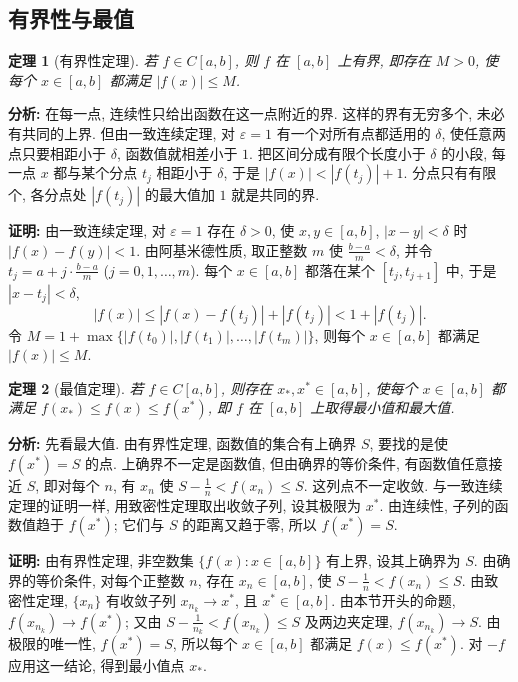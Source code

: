 \documentclass[UTF8,openany]{ctexbook}
\theoremstyle{chinesetextbook}
\newtheorem{theorem}{定理}[section]
\newenvironment{cnproof}{\par\indent\textbf{证明:} \ignorespaces}{\par}
\begin{document}
\subsection{有界性与最值}
\begin{theorem}[有界性定理]
若 $f\in C[a,b]$, 则 $f$ 在 $[a,b]$ 上有界, 即存在 $M>0$, 使每个 $x\in[a,b]$ 都满足 $|f(x)|\le M$.
\end{theorem}
\par\indent\textbf{分析:} 在每一点, 连续性只给出函数在这一点附近的界. 这样的界有无穷多个, 未必有共同的上界. 但由一致连续定理, 对 $\varepsilon=1$ 有一个对所有点都适用的 $\delta$, 使任意两点只要相距小于 $\delta$, 函数值就相差小于 $1$. 把区间分成有限个长度小于 $\delta$ 的小段, 每一点 $x$ 都与某个分点 $t_j$ 相距小于 $\delta$, 于是 $|f(x)|<|f(t_j)|+1$. 分点只有有限个, 各分点处 $|f(t_j)|$ 的最大值加 $1$ 就是共同的界.
\begin{cnproof}
由一致连续定理, 对 $\varepsilon=1$ 存在 $\delta>0$, 使 $x,y\in[a,b]$, $|x-y|<\delta$ 时 $|f(x)-f(y)|<1$. 由阿基米德性质, 取正整数 $m$ 使 $\displaystyle\frac{b-a}m<\delta$, 并令 $\displaystyle t_j=a+j\cdot\frac{b-a}m$ ($j=0,1,\ldots,m$). 每个 $x\in[a,b]$ 都落在某个 $[t_j,t_{j+1}]$ 中, 于是 $|x-t_j|<\delta$,
\[
|f(x)|\le|f(x)-f(t_j)|+|f(t_j)|<1+|f(t_j)|.
\]
令 $M=1+\max\{|f(t_0)|,|f(t_1)|,\ldots,|f(t_m)|\}$, 则每个 $x\in[a,b]$ 都满足 $|f(x)|\le M$.
\end{cnproof}
\begin{theorem}[最值定理]
若 $f\in C[a,b]$, 则存在 $x_*,x^*\in[a,b]$, 使每个 $x\in[a,b]$ 都满足 $f(x_*)\le f(x)\le f(x^*)$, 即 $f$ 在 $[a,b]$ 上取得最小值和最大值.
\end{theorem}
\par\indent\textbf{分析:} 先看最大值. 由有界性定理, 函数值的集合有上确界 $S$, 要找的是使 $f(x^*)=S$ 的点. 上确界不一定是函数值, 但由确界的等价条件, 有函数值任意接近 $S$, 即对每个 $n$, 有 $x_n$ 使 $\displaystyle S-\frac1n<f(x_n)\le S$. 这列点不一定收敛. 与一致连续定理的证明一样, 用致密性定理取出收敛子列, 设其极限为 $x^*$. 由连续性, 子列的函数值趋于 $f(x^*)$; 它们与 $S$ 的距离又趋于零, 所以 $f(x^*)=S$.
\begin{cnproof}
由有界性定理, 非空数集 $\{f(x):x\in[a,b]\}$ 有上界, 设其上确界为 $S$. 由确界的等价条件, 对每个正整数 $n$, 存在 $x_n\in[a,b]$, 使 $\displaystyle S-\frac1n<f(x_n)\le S$. 由致密性定理, $\{x_n\}$ 有收敛子列 $x_{n_k}\to x^*$, 且 $x^*\in[a,b]$. 由本节开头的命题, $f(x_{n_k})\to f(x^*)$; 又由 $\displaystyle S-\frac1{n_k}<f(x_{n_k})\le S$ 及两边夹定理, $f(x_{n_k})\to S$. 由极限的唯一性, $f(x^*)=S$, 所以每个 $x\in[a,b]$ 都满足 $f(x)\le f(x^*)$. 对 $-f$ 应用这一结论, 得到最小值点 $x_*$.
\end{cnproof}
\end{document}
